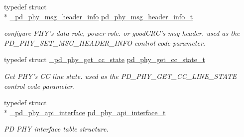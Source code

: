 \begin{DoxyCompactItemize}
typedef struct \\*
\hyperlink{struct__pd__phy__msg__header__info}{\-\_\-pd\-\_\-phy\-\_\-msg\-\_\-header\-\_\-info} \hyperlink{group__usb__pd__phy__drv_gae09b52ec05cde39c9fdc66f179a65d61}{pd\-\_\-phy\-\_\-msg\-\_\-header\-\_\-info\-\_\-t}
\begin{DoxyCompactList}\small\item\em configure P\-H\-Y's data role, power role. or good\-C\-R\-C's msg header. used as the P\-D\-\_\-\-P\-H\-Y\-\_\-\-S\-E\-T\-\_\-\-M\-S\-G\-\_\-\-H\-E\-A\-D\-E\-R\-\_\-\-I\-N\-F\-O control code parameter. \end{DoxyCompactList}\item 
typedef struct \hyperlink{struct__pd__phy__get__cc__state}{\-\_\-pd\-\_\-phy\-\_\-get\-\_\-cc\-\_\-state} \hyperlink{group__usb__pd__phy__drv_gaad64c8a6c58f68d58feedd48b49778bd}{pd\-\_\-phy\-\_\-get\-\_\-cc\-\_\-state\-\_\-t}
\begin{DoxyCompactList}\small\item\em Get P\-H\-Y's C\-C line state. used as the P\-D\-\_\-\-P\-H\-Y\-\_\-\-G\-E\-T\-\_\-\-C\-C\-\_\-\-L\-I\-N\-E\-\_\-\-S\-T\-A\-T\-E control code parameter. \end{DoxyCompactList}\item 
typedef struct \\*
\hyperlink{struct__pd__phy__api__interface}{\-\_\-pd\-\_\-phy\-\_\-api\-\_\-interface} \hyperlink{group__usb__pd__phy__drv_ga9494f6971e6132cb70c98b92f45af74f}{pd\-\_\-phy\-\_\-api\-\_\-interface\-\_\-t}
\begin{DoxyCompactList}\small\item\em P\-D P\-H\-Y interface table structure. \end{DoxyCompactList}\end{DoxyCompactItemize}

